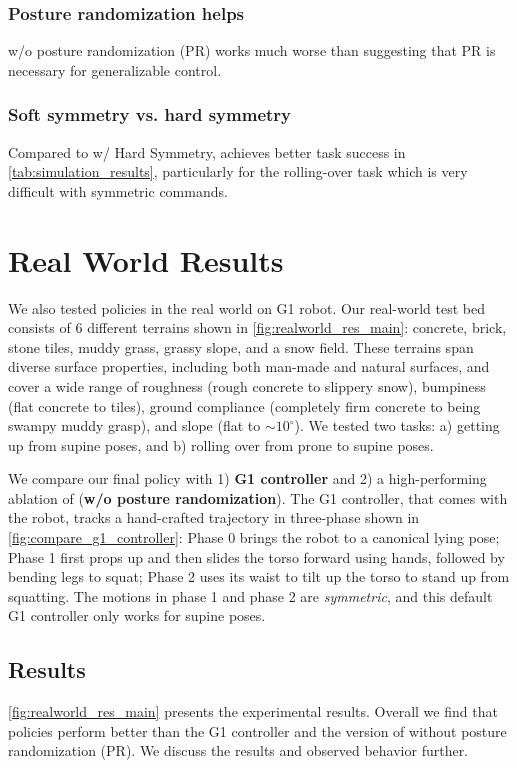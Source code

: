 \subsubsection{Posture randomization helps}
\ours w/o posture randomization (PR) works much worse than \ours suggesting that PR is necessary for generalizable control.

\subsubsection{Soft symmetry vs. hard symmetry}
Compared to \ours w/ Hard Symmetry, \ours achieves better task success in \cref{tab:simulation_results}, particularly for the rolling-over task which is very difficult with symmetric commands.





\section{Real World Results}\label{sec:real_exp}
We also tested \ours policies in the real world on G1 robot. 
Our real-world test bed consists of 6 different terrains shown in \cref{fig:realworld_res_main}: concrete, brick, stone tiles, muddy grass, grassy slope, and a snow field. 
These terrains span diverse surface properties, including both man-made and natural surfaces, and cover a wide range of roughness (rough concrete to slippery snow), bumpiness (flat concrete to tiles), ground compliance (completely firm concrete to being swampy muddy grasp), and slope (flat to $\sim 10^\circ$). 
We tested two tasks: a) getting up from supine poses, and b) rolling over from prone to supine poses. 


We compare our final \ours policy with
1) \textbf{G1 controller} and 2) a high-performing ablation of \ours (\textbf{\ours w/o posture randomization}). 
The G1 controller, that comes with the robot, tracks a hand-crafted trajectory in three-phase shown in \cref{fig:compare_g1_controller}:
Phase 0 brings the robot to a canonical lying pose; Phase 1 first props up and then slides the torso forward using hands, followed by bending legs to squat; Phase 2 uses its waist to tilt up the torso to stand up from squatting.
The motions in phase 1 and phase 2 are \textit{symmetric}, and this default G1 controller only works for supine poses.

\subsection{Results}\label{sec:real_res}
\cref{fig:realworld_res_main} presents the experimental results. 
Overall we find that \ours policies perform better than the G1 controller and the version of \ours without posture randomization (PR). We discuss the results and observed behavior further.

